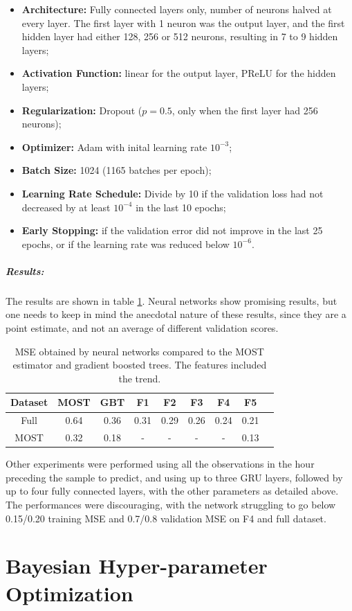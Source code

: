 \documentclass[a4paper]{book}
\begin{document}
\begin{itemize}
\item \textbf{Architecture:} Fully connected layers only, number of neurons halved at every layer. The first layer with 1 neuron was the output layer, and the first hidden layer had either 128, 256 or 512 neurons, resulting in 7 to 9 hidden layers;
\item \textbf{Activation Function:} linear for the output layer, PReLU \citep{prelu} for the hidden layers;
\item \textbf{Regularization:} Dropout ($p=0.5$, only when the first layer had 256 neurons);
\item \textbf{Optimizer:} Adam \citep{adam} with inital learning rate $10^{-3}$;
\item \textbf{Batch Size:} 1024 (1165 batches per epoch);
\item \textbf{Learning Rate Schedule:} Divide by 10 if the validation loss had not decreased by at least $10^{-4}$ in the last 10 epochs;
\item \textbf{Early Stopping:} if the validation error did not improve in the last 25 epochs, or if the learning rate was reduced below $10^{-6}$.
\end{itemize}

\paragraph{Results:}
The results are shown in table \ref{tbl:nnets}. Neural networks show promising results, but one needs to keep in mind the anecdotal nature of these results, since they are a point estimate, and not an average of different validation scores.

\begin{table}
\caption{MSE obtained by neural networks compared to the MOST estimator and gradient boosted trees. The features included the trend.}
\label{tbl:nnets}
\centering
\begin{tabular}{ccc|cccccc}
\toprule
\textbf{Dataset} & \textbf{MOST} & \textbf{GBT} & \textbf{F1} & \textbf{F2} & \textbf{F3} & \textbf{F4} & \textbf{F5} \\
\midrule
Full & 0.64 & 0.36 & 0.31 & 0.29 & 0.26 & 0.24 & 0.21 \\
MOST & 0.32 & 0.18 & - & - & - & - & 0.13 \\
\bottomrule
\end{tabular}
\end{table}

Other experiments were performed using all the observations in the hour preceding the sample to predict, and using up to three GRU layers, followed by up to four fully connected layers, with the other parameters as detailed above. The performances were discouraging, with the network struggling to go below 0.15/0.20 training MSE and 0.7/0.8 validation MSE on F4 and full dataset.


\chapter{Bayesian Hyper-parameter Optimization}

%
%


\end{document}
